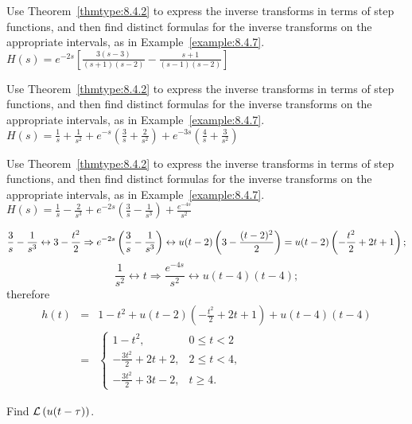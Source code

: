 \documentclass{ximera}
\begin{document}
\begin{problem}\label{exer:8.4.26} Use Theorem~\ref{thmtype:8.4.2} to express the inverse transforms in terms of step functions, and then find distinct formulas for the inverse transforms on the appropriate intervals, as in
Example~\ref{example:8.4.7}.  $H(s)= e^{-2s}\left[\frac{3(s-3)}{(s+1)(s-2)}-\frac{s+1}{(s-1)(s-2)}\right]$
\end{problem}

\begin{problem}\label{exer:8.4.27} Use Theorem~\ref{thmtype:8.4.2} to express the inverse transforms in terms of step functions, and then find distinct formulas for the inverse transforms on the appropriate intervals, as in
Example~\ref{example:8.4.7}.
$H(s)=\frac{1}{s}+\frac{1}{s^2}+e^{-s}\left(\frac{3}{s}+\frac{2}{s^2}\right) +e^{-3s}\left(\frac{4}{s}+\frac{3}{s^2}\right)$
\end{problem}

\begin{problem}\label{exer:8.4.28}
Use Theorem~\ref{thmtype:8.4.2} to express the inverse transforms in terms of step functions, and then find distinct formulas for the inverse transforms on the appropriate intervals, as in
Example~\ref{example:8.4.7}.
$H(s)=\frac{1}{s}-\frac{2}{s^3}+e^{-2s}\left(\frac{3}{s}-\frac{1}{s^3}\right) +\frac{e^{-4s}}{s^2}$

\begin{solution}
$$
\frac{3}{s}-\frac{1}{s^3}\leftrightarrow 3-{t^2\over2}\Rightarrow
e^{-2s}\left(\frac{3}{s}-\frac{1}{s^3}\right)\leftrightarrow
u(t-2)\left(3-\frac{(t-2)^2}{2}\right)=u(t-2)
\left(-\frac{t^2}{2}+2t+1\right);
$$
$$
\frac{1}{s^2}\leftrightarrow t\Rightarrow
\frac{e^{-4s}}{s^2}\leftrightarrow u(t-4)(t-4);
$$
therefore
\begin{eqnarray*}
h(t)&=&1-t^2+u(t-2)\left(-\frac{t^2}{2}+2t+1\right) +u(t-4)(t-4)
\\&=&
\left\{\begin{array}{cl} 1-t^2,&0\le
t<2\\ -\frac{3t^2}{2} +2t+2,&2\le
t<4,\\ -\frac{3t^2}{2}+3t-2,&t\ge 4.\end{array}\right.
\end{eqnarray*}
\end{solution}
\end{problem}

\begin{problem}\label{exer:8.4.29} Find ${\cal L}\left(u(t-\tau)\right)$.
\end{problem}
\end{document}
